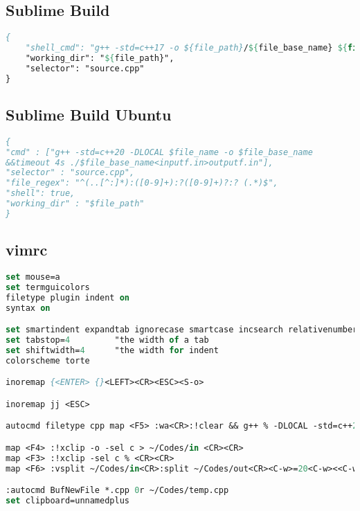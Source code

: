 \subsection*{Sublime Build}
\begin{lstlisting}[language= Pascal, commentstyle=\color{black}, numberstyle=\tiny\color{black}, keywordstyle=\color{black}, stringstyle=\color{black},
]
{
    "shell_cmd": "g++ -std=c++17 -o ${file_path}/${file_base_name} ${file} && ${file_path}/${file_base_name} < input.txt > output.txt",
    "working_dir": "${file_path}",
    "selector": "source.cpp"
}
\end{lstlisting}
\subsection*{Sublime Build Ubuntu}

\begin{lstlisting}[language= Pascal, commentstyle=\color{black}, numberstyle=\tiny\color{black}, keywordstyle=\color{black}, stringstyle=\color{black},
]
{
"cmd" : ["g++ -std=c++20 -DLOCAL $file_name -o $file_base_name 
&&timeout 4s ./$file_base_name<inputf.in>outputf.in"],
"selector" : "source.cpp",
"file_regex": "^(..[^:]*):([0-9]+):?([0-9]+)?:? (.*)$",
"shell": true,
"working_dir" : "$file_path"
}
\end{lstlisting}
\subsection*{vimrc}

\begin{lstlisting}[language= Pascal, commentstyle=\color{black}, numberstyle=\tiny\color{black}, keywordstyle=\color{black}, stringstyle=\color{black},
]
set mouse=a
set termguicolors
filetype plugin indent on
syntax on

set smartindent expandtab ignorecase smartcase incsearch relativenumber nowrap autoread splitright splitbelow
set tabstop=4         "the width of a tab
set shiftwidth=4      "the width for indent
colorscheme torte

inoremap {<ENTER> {}<LEFT><CR><ESC><S-o>

inoremap jj <ESC>  

autocmd filetype cpp map <F5> :wa<CR>:!clear && g++ % -DLOCAL -std=c++20 -Wall -Wextra -Wconversion -Wshadow -Wfloat-equal -o  ~/Codes/prog && (timeout 5 ~/Codes/prog < ~/Codes/in) >  ~/Codes/out<CR>

map <F4> :!xclip -o -sel c > ~/Codes/in <CR><CR>
map <F3> :!xclip -sel c % <CR><CR>
map <F6> :vsplit ~/Codes/in<CR>:split ~/Codes/out<CR><C-w>=20<C-w><<C-w><C-h>

:autocmd BufNewFile *.cpp 0r ~/Codes/temp.cpp
set clipboard=unnamedplus
\end{lstlisting}

